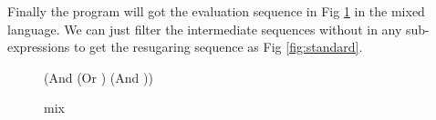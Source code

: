 Finally the program  will got the evaluation sequence in Fig \ref{fig:mixexec} in the mixed language. We can just filter the intermediate sequences without  in any sub-expressions to get the resugaring sequence as Fig \ref{fig:standard}.

\begin{figure}[t]
\begin{center}
\begin{minipage}{6cm}
\begin{scriptsize}
\begin{Codes}
    (And (Or \true \false) (And \false \true))
\OneStep{ \false}
\end{Codes}
\end{scriptsize}
\end{minipage}
\end{center}
\caption{mix}
\label{fig:mixexec}
\end{figure}